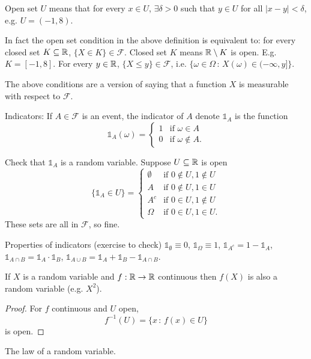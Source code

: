 \documentclass[10pt, a4paper]{article}
\begin{document}
Open set $U$ means that for every $x \in U$,
$\exists \delta > 0$ such that $y \in U$ for all $|x - y| < \delta$,
e.g. $U = (-1, 8)$.

In fact the open set condition in the above definition is equivalent to:
for every closed set $K \subseteq \mathbb{R}$,
$\{X \in K\} \in \mathcal{F}$.
Closed set $K$ means $\mathbb{R} \setminus K$ is open.
E.g. $K = [-1, 8]$.
For every $y \in \mathbb{R}$,
$\{X \leq y\} \in \mathcal{F}$,
i.e. $\{\omega \in \Omega\,:\,X(\omega) \in (-\infty, y]\}$.

The above conditions are a version of saying that a function $X$ is measurable with respect to $\mathcal{F}$.

Indicators:
If $A \in \mathcal{F}$ is an event,
the indicator of $A$ denote $\mathbb{1}_{A}$ is the function
\[
\mathbb{1}_{A}(\omega) = \begin{cases}
    1 &\text{if } \omega \in A \\
    0 &\text{if } \omega \notin A.
\end{cases}
\]

Check that $\mathbb{1}_A$ is a random variable.
Suppose $U \subseteq \mathbb{R}$ is open
\[
\{\mathbb{1}_{A} \in U\} = \begin{cases}
    \emptyset &\text{if } 0 \notin U, 1 \notin U \\
    A &\text{if } 0 \notin U, 1 \in U \\
    A ^ c &\text{if } 0 \in U, 1 \notin U \\
    \Omega &\text{if } 0 \in U, 1 \in U.
\end{cases}
\]
These sets are all in $\mathcal{F}$,
so fine.

Properties of indicators
(exercise to check)
$\mathbb{1}_{\emptyset} \equiv 0$,
$\mathbb{1}_{\Omega} \equiv 1$,
$\mathbb{1}_{A ^ c} = 1 - \mathbb{1}_{A}$,
$\mathbb{1}_{A \cap B} = \mathbb{1}_{A}\cdot\mathbb{1}_{B}$,
$\mathbb{1}_{A \cup B} = \mathbb{1}_{A} + \mathbb{1}_{B} - \mathbb{1}_{A \cap B}$.

\begin{lemma}
    If $X$ is a random variable and $f : \mathbb{R} \to \mathbb{R}$ continuous then $f(X)$ is also a random variable
    (e.g. $X ^ 2$).

    \begin{proof}
        For $f$ continuous and $U$ open,
        \[
        f ^ {-1}(U) = \{x\,:\, f(x) \in U\}
        \]
        is open.
    \end{proof}
\end{lemma}

The law of a random variable.
\end{document}
